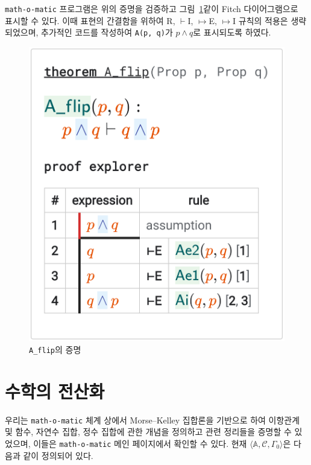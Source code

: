 \documentclass[10pt,twocolumn]{article}
\theoremstyle{definition}
\begin{document}
\texttt{math-o-matic} 프로그램은 위의 증명을 검증하고 그림~\ref{fig:Aflip}\과 같이 Fitch 다이어그램으로 표시할 수 있다. 이때 표현의 간결함을 위하여 R, $\vdash$I, $\mapsto$E, $\mapsto$I 규칙의 적용은 생략되었으며, 추가적인 코드를 작성하여 \verb!A(p, q)!가 $p\land q$로 표시되도록 하였다.

\begin{figure}[bt!] \centering
	\includegraphics[scale=.18]{A_flip}
	\caption{\texttt{A\_flip}의 증명} \label{fig:Aflip}
\end{figure}


\section{수학의 전산화}

우리는 \texttt{math-o-matic} 체계 상에서 Morse--Kelley 집합론을 기반으로 하여 이항관계 및 함수, 자연수 집합, 정수 집합에 관한 개념을 정의하고 관련 정리들을 증명할 수 있었으며, 이들은 \texttt{math-o-matic} 메인 페이지에서 확인할 수 있다. 현재 $\langle\mathbb A, \mathcal C, \Gamma_0\rangle$은 다음과 같이 정의되어 있다.
\end{document}
